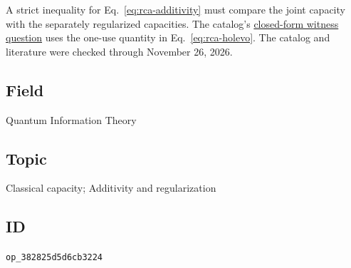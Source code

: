 A strict inequality for Eq.~\eqref{eq:rca-additivity} must compare the joint capacity with the separately regularized capacities. The catalog's \href{https://qiqc-op.com/problem/op_25e23d6e92ebce9d/}{closed-form witness question} uses the one-use quantity in Eq.~\eqref{eq:rca-holevo}. The catalog and literature were checked through November 26, 2026.

\subsection*{Field}

Quantum Information Theory

\subsection*{Topic}

Classical capacity; Additivity and regularization

\subsection*{ID}

\texttt{op\_382825d5d6cb3224}
